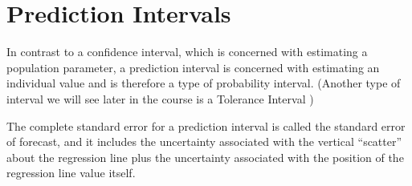 \section{ Prediction Intervals }
 
In contrast to a confidence interval, which is concerned with estimating a population parameter, a 
prediction interval is concerned with estimating an individual value and is therefore a type of 
probability interval. (Another type of interval we will see later in the course is a Tolerance Interval ) 
 
The complete standard error for a prediction interval is called the standard error of forecast, and it 
includes the uncertainty associated with the vertical “scatter” about the regression line plus the 
uncertainty associated with the position of the regression line value itself. 

